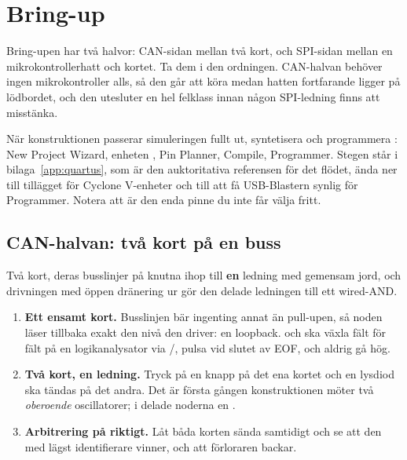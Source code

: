\section{Bring-up}
\label{c19:sec:bringup}

Bring-upen har två halvor: CAN-sidan mellan två kort, och SPI-sidan mellan en mikrokontrollerhatt och
kortet. Ta dem i den ordningen. CAN-halvan behöver ingen mikrokontroller alls, så den går att köra
medan hatten fortfarande ligger på lödbordet, och den utesluter en hel felklass innan någon
SPI-ledning finns att misstänka.

När konstruktionen passerar simuleringen fullt ut, syntetisera och programmera :
New Project Wizard, enheten , Pin Planner, Compile, Programmer. Stegen står i
bilaga~\ref{app:quartus}, som är den auktoritativa referensen för det flödet, ända ner till tillägget
för Cyclone V-enheter och till att få USB-Blastern synlig för Programmer. Notera att 
är den enda pinne du inte får välja fritt.

\subsection*{CAN-halvan: två kort på en buss}
Två kort, deras busslinjer på  knutna ihop till \textbf{en} ledning med gemensam
jord, och drivningen med öppen dränering ur  gör den delade ledningen till ett
wired-AND.

\begin{enumerate}
  \item \textbf{Ett ensamt kort.} Busslinjen bär ingenting annat än pull-upen, så noden läser
    tillbaka exakt den nivå den driver: en loopback.  och  ska växla fält
    för fält på en logikanalysator via /,  pulsa vid
    slutet av EOF, och  aldrig gå hög.
  \item \textbf{Två kort, en ledning.} Tryck på en knapp på det ena kortet och en lysdiod ska tändas
    på det andra. Det är första gången konstruktionen möter två \emph{oberoende} oscillatorer; i
     delade noderna en .
  \item \textbf{Arbitrering på riktigt.} Låt båda korten sända samtidigt och se att den med lägst
    identifierare vinner, och att förloraren backar.
\end{enumerate}

